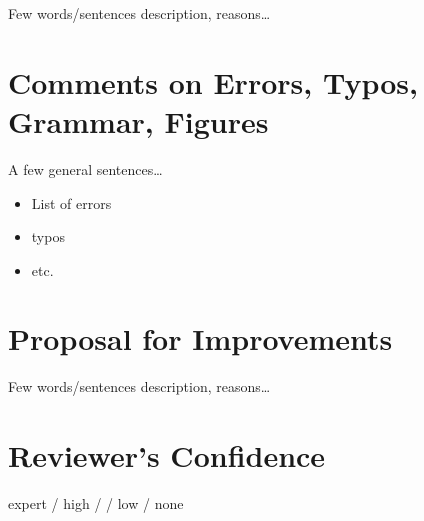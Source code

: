 \documentclass[a4paper,12pt]{article}
\begin{document}
Few words/sentences description, reasons\dots  %


\section{Comments on Errors, Typos, Grammar, Figures}

A few general sentences\dots

\begin{itemize}
\item List of errors
\item typos
\item etc.
\end{itemize}


\section{Proposal for Improvements}

Few words/sentences description, reasons\dots  %


\section{Reviewer's Confidence}

expert / high /  / low / none




\end{document}
